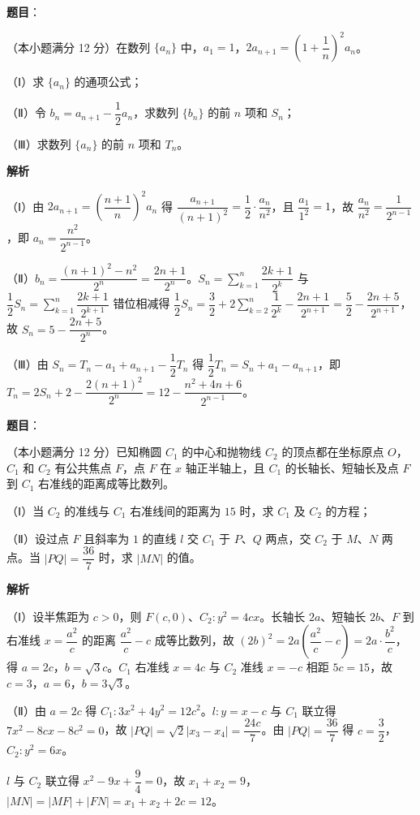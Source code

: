 \begin{answer}

\textbf{题目}：

（本小题满分 12 分）在数列 $\{a_n\}$ 中，$a_1=1$，$2a_{n+1}=\left(1+\dfrac1n\right)^2a_n$。

（Ⅰ）求 $\{a_n\}$ 的通项公式；

（Ⅱ）令 $b_n=a_{n+1}-\dfrac12a_n$，求数列 $\{b_n\}$ 的前 $n$ 项和 $S_n$；

（Ⅲ）求数列 $\{a_n\}$ 的前 $n$ 项和 $T_n$。

\textbf{解析}

（Ⅰ）由 $2a_{n+1}=\left(\dfrac{n+1}n\right)^2a_n$ 得 $\dfrac{a_{n+1}}{(n+1)^2}=\dfrac12\cdot\dfrac{a_n}{n^2}$，且 $\dfrac{a_1}{1^2}=1$，故 $\dfrac{a_n}{n^2}=\dfrac1{2^{n-1}}$，即 $a_n=\dfrac{n^2}{2^{n-1}}$。

（Ⅱ）$b_n=\dfrac{(n+1)^2-n^2}{2^n}=\dfrac{2n+1}{2^n}$。$S_n=\sum\limits_{k=1}^n\dfrac{2k+1}{2^k}$ 与 $\dfrac12S_n=\sum\limits_{k=1}^n\dfrac{2k+1}{2^{k+1}}$ 错位相减得 $\dfrac12S_n=\dfrac32+2\sum\limits_{k=2}^n\dfrac1{2^k}-\dfrac{2n+1}{2^{n+1}}=\dfrac52-\dfrac{2n+5}{2^{n+1}}$，故 $S_n=5-\dfrac{2n+5}{2^n}$。

（Ⅲ）由 $S_n=T_n-a_1+a_{n+1}-\dfrac12T_n$ 得 $\dfrac12T_n=S_n+a_1-a_{n+1}$，即 $T_n=2S_n+2-\dfrac{2(n+1)^2}{2^n}=12-\dfrac{n^2+4n+6}{2^{n-1}}$。


\end{answer}
\begin{answer}

\textbf{题目}：

（本小题满分 12 分）已知椭圆 $C_1$ 的中心和抛物线 $C_2$ 的顶点都在坐标原点 $O$，$C_1$ 和 $C_2$ 有公共焦点 $F$，点 $F$ 在 $x$ 轴正半轴上，且 $C_1$ 的长轴长、短轴长及点 $F$ 到 $C_1$ 右准线的距离成等比数列。

（Ⅰ）当 $C_2$ 的准线与 $C_1$ 右准线间的距离为 $15$ 时，求 $C_1$ 及 $C_2$ 的方程；

（Ⅱ）设过点 $F$ 且斜率为 $1$ 的直线 $l$ 交 $C_1$ 于 $P$、$Q$ 两点，交 $C_2$ 于 $M$、$N$ 两点。当 $|PQ|=\dfrac{36}7$ 时，求 $|MN|$ 的值。

\textbf{解析}

（Ⅰ）设半焦距为 $c>0$，则 $F(c,0)$、$C_2:y^2=4cx$。长轴长 $2a$、短轴长 $2b$、$F$ 到右准线 $x=\dfrac{a^2}c$ 的距离 $\dfrac{a^2}c-c$ 成等比数列，故 $(2b)^2=2a\left(\dfrac{a^2}c-c\right)=2a\cdot\dfrac{b^2}c$，得 $a=2c$，$b=\sqrt3c$。$C_1$ 右准线 $x=4c$ 与 $C_2$ 准线 $x=-c$ 相距 $5c=15$，故 $c=3$，$a=6$，$b=3\sqrt3$。

（Ⅱ）由 $a=2c$ 得 $C_1:3x^2+4y^2=12c^2$。$l:y=x-c$ 与 $C_1$ 联立得 $7x^2-8cx-8c^2=0$，故 $|PQ|=\sqrt2|x_3-x_4|=\dfrac{24c}7$。由 $|PQ|=\dfrac{36}7$ 得 $c=\dfrac32$，$C_2:y^2=6x$。

$l$ 与 $C_2$ 联立得 $x^2-9x+\dfrac94=0$，故 $x_1+x_2=9$，$|MN|=|MF|+|FN|=x_1+x_2+2c=12$。


\end{answer}
